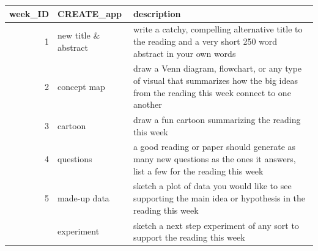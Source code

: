 \documentclass[
]{book}
\begin{document}
\begin{tabular}{rll}
\toprule
week\_ID & CREATE\_app & description\\
\midrule
1 & new title \& abstract & write a catchy, compelling alternative title to the reading and a very short 250 word abstract in your own words\\
2 & concept map & draw a Venn diagram, flowchart, or any type of visual that summarizes how the big ideas from the reading this week connect to one another\\
3 & cartoon & draw a fun cartoon summarizing the reading this week\\
4 & questions & a good reading or paper should generate as many new questions as the ones it answers, list a few for the reading this week\\
5 & made-up data & sketch a plot of data you would like to see supporting the main idea or hypothesis in the reading this week\\
\addlinespace
6 & experiment & sketch a next step experiment of any sort to support the reading this week\\
\bottomrule
\end{tabular}

  
\end{document}
